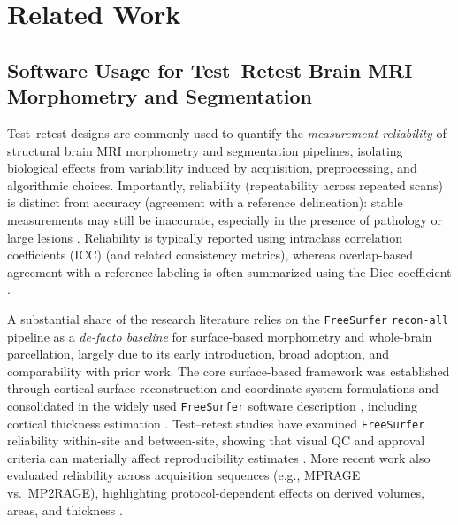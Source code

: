 \documentclass{midl} %
\begin{document}
\clearpage




\clearpage
\appendix



\section{Related Work}

\subsection{Software Usage for Test--Retest Brain MRI Morphometry and Segmentation}

Test--retest designs are commonly used to quantify the \emph{measurement reliability} of structural brain MRI morphometry and segmentation pipelines, isolating biological effects from variability induced by acquisition, preprocessing, and algorithmic choices. Importantly, reliability (repeatability across repeated scans) is distinct from accuracy (agreement with a reference delineation): stable measurements may still be inaccurate, especially in the presence of pathology or large lesions \citep{Eggert2012}. Reliability is typically reported using intraclass correlation coefficients (ICC) \citep{ShroutFleiss1979} (and related consistency metrics), whereas overlap-based agreement with a reference labeling is often summarized using the Dice coefficient \citep{Dice1945}.

A substantial share of the research literature relies on the \texttt{FreeSurfer} \texttt{recon-all} pipeline as a \emph{de-facto baseline} for surface-based morphometry and whole-brain parcellation, largely due to its early introduction, broad adoption, and comparability with prior work. The core surface-based framework was established through cortical surface reconstruction and coordinate-system formulations \citep{Dale1999a,Fischl1999,Sereno1996} and consolidated in the widely used \texttt{FreeSurfer} software description \citep{Fischl2012}, including cortical thickness estimation \citep{DaleSereno2000}. Test--retest studies have examined \texttt{FreeSurfer} reliability within-site and between-site, showing that visual QC and approval criteria can materially affect reproducibility estimates \citep{Iscan2015}. More recent work also evaluated reliability across acquisition sequences (e.g., MPRAGE vs.\ MP2RAGE), highlighting protocol-dependent effects on derived volumes, areas, and thickness \citep{FreeSurferMPRAGE2022}.
\end{document}
